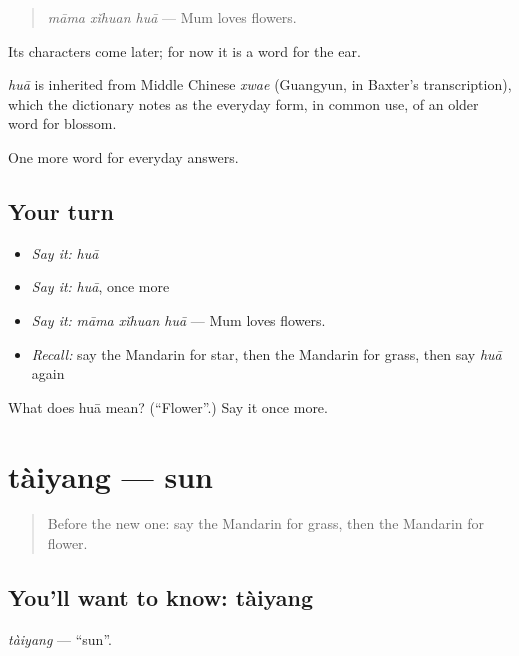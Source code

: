 \begin{quote}
\emph{māma xǐhuan huā} — Mum loves flowers.
\end{quote}

Its characters come later; for now it is a word for the ear.

\begin{cousinweb}
\emph{huā} is inherited from Middle Chinese \emph{xwae} (Guangyun, in Baxter's transcription), which the dictionary notes as the everyday form, in common use, of an older word for blossom.
\end{cousinweb}

\begin{grammarlens}[title={What you've built}]
One more word for everyday answers.
\end{grammarlens}

\subsection*{Your turn}
\begin{itemize}
\raggedright
  \item \emph{Say it:} \emph{huā}
  \item \emph{Say it:} \emph{huā}, once more
  \item \emph{Say it:} \emph{māma xǐhuan huā} — Mum loves flowers.
  \item \emph{Recall:} say the Mandarin for star, then the Mandarin for grass, then say \emph{huā} again
\end{itemize}

\begin{tcolorbox}[breakable,colback=teal!4,colframe=teal!35!black,title={Before you move on}]
What does huā mean? (\textquotedblleft{}Flower\textquotedblright{}.) Say it once more.
\end{tcolorbox}
\section[tàiyang]{tàiyang — sun}

\label{lesson:ZH-C68-taiyang}



\begin{quote}
Before the new one: say the Mandarin for grass, then the Mandarin for flower.
\end{quote}

\subsection*{You'll want to know: tàiyang}
\emph{tàiyang} — \textquotedblleft{}sun\textquotedblright{}.

